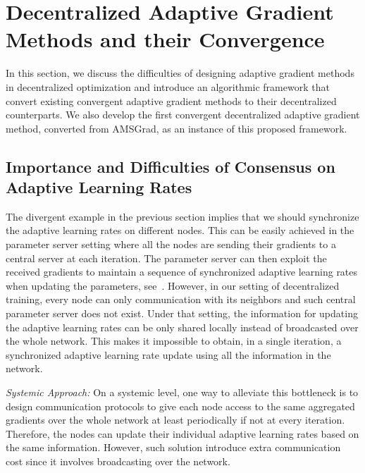 \documentclass{article} %
\begin{document}
\vspace{-0.05in}
\section{Decentralized Adaptive Gradient Methods and their Convergence}\label{sec:main}
\vspace{-0.05in}

In this section, we discuss the difficulties of designing adaptive gradient methods in decentralized optimization and introduce an algorithmic framework that convert existing convergent adaptive gradient methods to their decentralized counterparts. 
We also develop the first convergent decentralized adaptive gradient method, converted from AMSGrad, as an instance of this proposed framework.

\vspace{-0.05in}
\subsection{Importance and Difficulties of Consensus on Adaptive Learning Rates}
\vspace{-0.05in}

The divergent example in the previous section implies that we should synchronize the adaptive learning rates on different nodes. 
This can be easily achieved in the parameter server setting where all the nodes are sending their gradients to a central server at each iteration.
The parameter server can then exploit the received gradients to maintain a sequence of synchronized adaptive learning rates when updating the parameters, see~\citep{reddi2020adaptive}.
However, in our setting of decentralized training, every node can only communication with its neighbors and such central parameter server does not exist.
Under that setting, the information for updating the adaptive learning rates can be only shared locally instead of broadcasted over the whole network.
This makes it impossible to obtain, in a single iteration, a synchronized adaptive learning rate update using all the information in the network. 

\textit{Systemic Approach:} On a systemic level, one way to alleviate this bottleneck is to design communication protocols to give each node access to the same aggregated gradients over the whole network at least periodically if not at every iteration.
Therefore, the nodes can update their individual adaptive learning rates based on the same information. However, such solution introduce extra communication cost since it involves broadcasting over the network.
\end{document}
